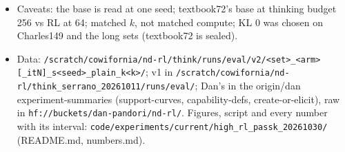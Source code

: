 {\begin{itemize}[nosep,leftmargin=1.2em]
    median RL is within about 2 points of the base at k512, two points slightly below it but not resolved ($-1.2$
    [$-4.8$, +2.4] and $-2.4$ [$-6.0$, +1.2]). The gap at k512 opens from about $10^{-2}$ (+4.0 [0.0, 8.0] at
    $6.6\times10^{-3}$, +10.4 at 0.03$\times$) and reaches +16.8 [12.0, 21.6] at the L3 end. Table:
    \nolinkurl{lowrl_1320.md} in the experiment folder.
  \item Caveats: the base is read at one seed; textbook72's base at thinking budget 256 vs RL at 64; matched $k$, not
    matched compute; KL 0 was chosen on Charles149 and the long sets (textbook72 is sealed).
  \item Data: \nolinkurl{/scratch/cowifornia/nd-rl/think/runs/eval/v2/<set>_<arm>[_itN]_s<seed>_plain_k<k>/};
    v1 in \nolinkurl{/scratch/cowifornia/nd-rl/think_serrano_20261011/runs/eval/}; Dan's in the origin/dan
    experiment-summaries (support-curves, capability-defs, create-or-elicit), raw in
    \nolinkurl{hf://buckets/dan-pandori/nd-rl/}. Figures, script and every number with its interval:
    \nolinkurl{code/experiments/current/high_rl_passk_20261030/} (README.md, numbers.md).
\end{itemize}}



